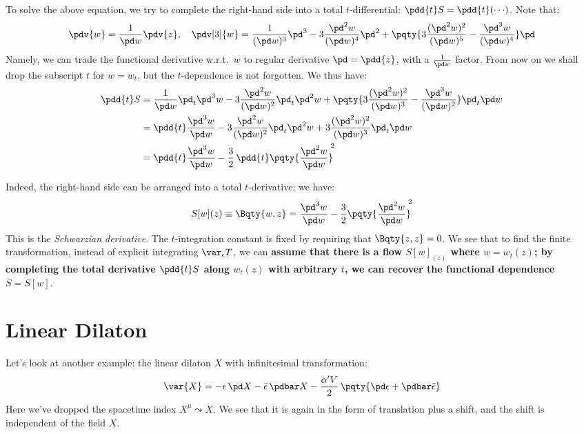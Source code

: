 \documentclass[a4paper
	,10pt
]{article}
\begin{document}
	To solve the above equation, we try to complete the right-hand side into a total $t$-differential: $
		\pdd{t} S = \pdd{t} ({\cdots})
	$. Note that:
	\begin{equation}
		\pdv{w} = \frac{1}{\pd w}\pdv{z},
	\quad
		\pdv[3]{w}
		= \frac{1}{(\pd w)^3} \pd^3
			- 3 \frac{\pd^2 w}{(\pd w)^4} \pd^2
			+ \pqty{
				3\frac{(\pd^2 w)^2}{(\pd w)^5}
				- \frac{\pd^3 w}{(\pd w)^4}
			} \pd
	\end{equation}
	Namely, we can trade the functional derivative w.r.t.~$w$ to regular derivative $\pd = \pdd{z}$, with a $\frac{1}{\pd w}$ factor. 
	From now on we shall drop the subscript $t$ for $w = w_t$, but the $t$-dependence is not forgotten. We thus have:
	\begin{equation}
	\begin{aligned}
		\pdd{t} S
		&= \frac{1}{\pd w}
				\pd_t \pd^3 w
			- 3 \frac{\pd^2 w}{(\pd w)^2}
				\pd_t \pd^2 w
			+ \pqty{
				3\frac{(\pd^2 w)^2}{(\pd w)^3}
				- \frac{\pd^3 w}{(\pd w)^2}
			} \pd_t \pd w \\
		&= \pdd{t} \frac{\pd^3 w}{\pd w}
			- 3 \frac{\pd^2 w}{(\pd w)^2}
				\pd_t \pd^2 w
			+ 3\frac{(\pd^2 w)^2}{(\pd w)^3}
				\pd_t \pd w \\
		&= \pdd{t} \frac{\pd^3 w}{\pd w}
			- \frac{3}{2}\,\pdd{t} 
				\pqty{\frac{\pd^2 w}{\pd w}}^{\!\!2} \\
	\end{aligned}
	\end{equation}
	
	Indeed, the right-hand side can be arranged into a total $t$-derivative; we have:
	\begin{equation}
		S[w](z)
		\equiv \Bqty{w,z}
		= \frac{\pd^3 w}{\pd w}
			- \frac{3}{2}
			\pqty{\frac{\pd^2 w}{\pd w}}^{\!\!2}
	\end{equation}
	This is the \textit{Schwarzian derivative}. The $t$-integration constant is fixed by requiring that $\Bqty{z,z} = 0$. We see that to find the finite transformation, instead of explicit integrating $\var_\epsilon T$, we can \textbf{assume that there is a flow $S[w]_{(z)}$ where $w = w_t(z)$; by completing the total derivative $\pdd{t} S$ along $w_t(z)$ with arbitrary $t$, we can recover the functional dependence $S = S[w]$}. 
	
\section{Linear Dilaton}
	Let's look at another example: the linear dilaton $X$ with infinitesimal transformation:
	\begin{equation}
		\var{X}
		= - \epsilon\,\pd X
			- \bar{\epsilon}\,\pdbar X
			- \frac{\alpha'V}{2}\,\pqty{
				\pd\epsilon
				+ \pdbar\bar{\epsilon}
			}
	\label{eq:dilaton_transformation}
	\end{equation}
	Here we've dropped the spacetime index $X^\mu \leadsto X$. We see that it is again in the form of translation plus a shift, and the shift is independent of the field $X$. 
	
\end{document}
